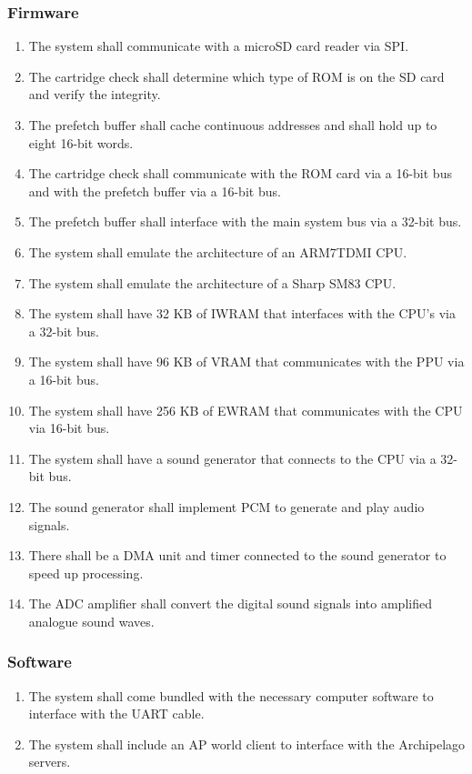 \subsubsection{Firmware}
\begin{enumerate}[label=\thesubsubsection.\arabic*]
	\item The system shall communicate with a microSD card reader via SPI.
	\item The cartridge check shall determine which type of ROM is on the SD card and verify the integrity.
	\item The prefetch buffer shall cache continuous addresses and shall hold up to eight 16-bit words.
	\item The cartridge check shall communicate with the ROM card via a 16-bit bus and with the prefetch buffer via a 16-bit bus.
	\item The prefetch buffer shall interface with the main system bus via a 32-bit bus.
	\item The system shall emulate the architecture of an ARM7TDMI CPU.
	\item The system shall emulate the architecture of a Sharp SM83 CPU.
	\item The system shall have 32 KB of IWRAM that interfaces with the CPU's via a 32-bit bus.
	\item The system shall have 96 KB of VRAM that communicates with the PPU via a 16-bit bus.
	\item The system shall have 256 KB of EWRAM that communicates with the CPU via 16-bit bus.
	\item The system shall have a sound generator that connects to the CPU via a 32-bit bus.
	\item The sound generator shall implement PCM to generate and play audio signals.
	\item There shall be a DMA unit and timer connected to the sound generator to speed up processing.
	\item The ADC amplifier shall convert the digital sound signals into amplified analogue sound waves.
\end{enumerate}

\subsubsection{Software}
\begin{enumerate}[label=\thesubsubsection.\arabic*]
	\item The system shall come bundled with the necessary computer software to interface with the UART cable.
	\item The system shall include an AP world client to interface with the Archipelago servers.
\end{enumerate}
